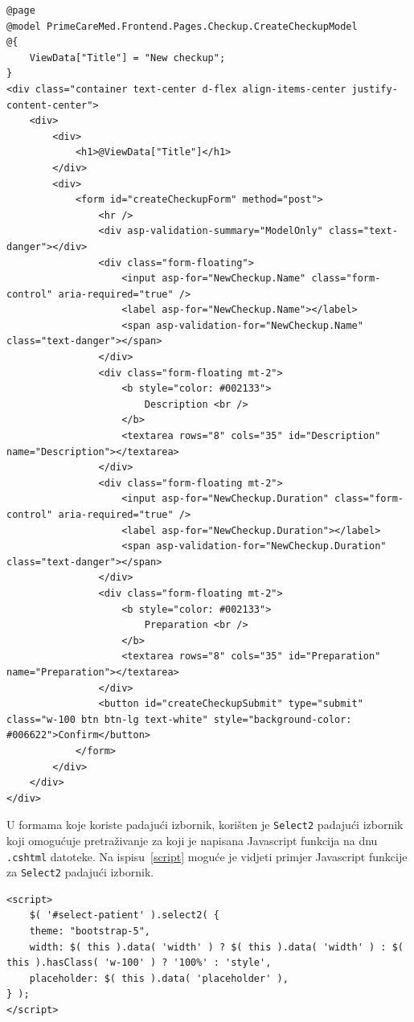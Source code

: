 \begin{lstlisting}[caption={\texttt{CreateCheckup.cshtml} datoteka}, label=createCheckupHtml]
@page
@model PrimeCareMed.Frontend.Pages.Checkup.CreateCheckupModel
@{
    ViewData["Title"] = "New checkup";
}
<div class="container text-center d-flex align-items-center justify-content-center">
    <div>
        <div>
            <h1>@ViewData["Title"]</h1>
        </div>
        <div>
            <form id="createCheckupForm" method="post">
                <hr />
                <div asp-validation-summary="ModelOnly" class="text-danger"></div>
                <div class="form-floating">
                    <input asp-for="NewCheckup.Name" class="form-control" aria-required="true" />
                    <label asp-for="NewCheckup.Name"></label>
                    <span asp-validation-for="NewCheckup.Name" class="text-danger"></span>
                </div>
                <div class="form-floating mt-2">
                    <b style="color: #002133">
                        Description <br />
                    </b>
                    <textarea rows="8" cols="35" id="Description" name="Description"></textarea>
                </div>
                <div class="form-floating mt-2">
                    <input asp-for="NewCheckup.Duration" class="form-control" aria-required="true" />
                    <label asp-for="NewCheckup.Duration"></label>
                    <span asp-validation-for="NewCheckup.Duration" class="text-danger"></span>
                </div>
                <div class="form-floating mt-2">
                    <b style="color: #002133">
                        Preparation <br />
                    </b>
                    <textarea rows="8" cols="35" id="Preparation" name="Preparation"></textarea>
                </div>
                <button id="createCheckupSubmit" type="submit" class="w-100 btn btn-lg text-white" style="background-color: #006622">Confirm</button>
            </form>
        </div>
    </div>
</div>
\end{lstlisting}

U formama koje koriste padajući izbornik, korišten je \texttt{Select2} padajući izbornik koji omogućuje pretraživanje za koji je napisana Javascript funkcija na dnu \texttt{.cshtml} datoteke. Na ispisu~\ref{script} moguće je vidjeti primjer Javascript funkcije za \texttt{Select2} padajući izbornik.

\begin{lstlisting}[caption={Javascript funkcija za \texttt{Select2} padajući izbornik}, label=script]
<script>
    $( '#select-patient' ).select2( {
    theme: "bootstrap-5",
    width: $( this ).data( 'width' ) ? $( this ).data( 'width' ) : $( this ).hasClass( 'w-100' ) ? '100%' : 'style',
    placeholder: $( this ).data( 'placeholder' ),
} );
</script>
\end{lstlisting}
